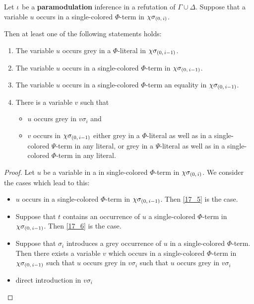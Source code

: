 \documentclass[,%
	draft=false,%
	numbers=noendperiod
	12pt,
	a4paper,
	oneside,%
	openany,
]{memoir}
\newcommand{\inv}{\ensuremath{\chi}}
\begin{document}
\begin{lemma}
	\label{lemma:var_in_sc_term_paramod}
	Let $\iota$ be a \textbf{paramodulation} inference in a refutation of $\Gamma\cup\Delta$.
	Suppose that a variable $u$ occurs in a single-colored $\Phi$-term in $\inv\sigmazi$.

	Then at least one of the following statements holds:
\begin{enumerate}
		\item
			\label{17_1}
			The variable $u$ occurs grey in a $\Phi$-literal in $\inv\sigmazmi$.

		\item
			\label{17_5}
			The variable $u$ occurs in a single-colored $\Phi$-term in $\inv\sigmazmi$.

		\item
			\label{17_6}
			The variable $u$ occurs in a single-colored $\Phi$-term an equality in $\inv\sigmazmi$.


		\item 
			\label{17_3}
			There is a variable $v$ such that
			{
				\renewcommand{\labelitemi}{\textendash}
				\begin{itemize}
					\item $u$ occurs grey in $v\sigma_i$ and
					\item
						$v$ occurs in $\inv\sigmazmi$
						either grey in a $\Phi$-literal as well as in a single-colored $\Psi$-term in any literal, 
						or grey in a $\Psi$-literal as well as in a single-colored $\Phi$-term in any literal.
				\end{itemize}
			}


	\end{enumerate}

\end{lemma}
\begin{proof}
	Let $u$ be a variable in a in single-colored $\Phi$-term in $\inv\sigmazi$. 
	We consider the cases which lead to this:
	\begin{itemize}
		\item $u$ occurs in a single-colored $\Phi$-term in $\inv\sigmazmi$.
			Then \ref{17_5} is the case.

		\item
			Suppose that $t$ contains an occurrence of $u$ a single-colored $\Phi$-term in $\inv\sigmazmi$.
			Then \ref{17_6} is the case.

		\item
			Suppose that $\sigma_i$ introduces a grey occurrence of $u$ in a single-colored $\Phi$-term.
			Then there exists a variable $v$ which occurs in a single-colored $\Phi$-term in $\inv\sigmazmi$ such that $u$ occurs grey in $v\sigma_i$ such that $u$ occurs grey in $v\sigma_i$
			\mytodo{}


		\item 
			direct introduction in $v\sigma_i$
			\mytodo{}


	\end{itemize}
\end{proof}
\end{document}
